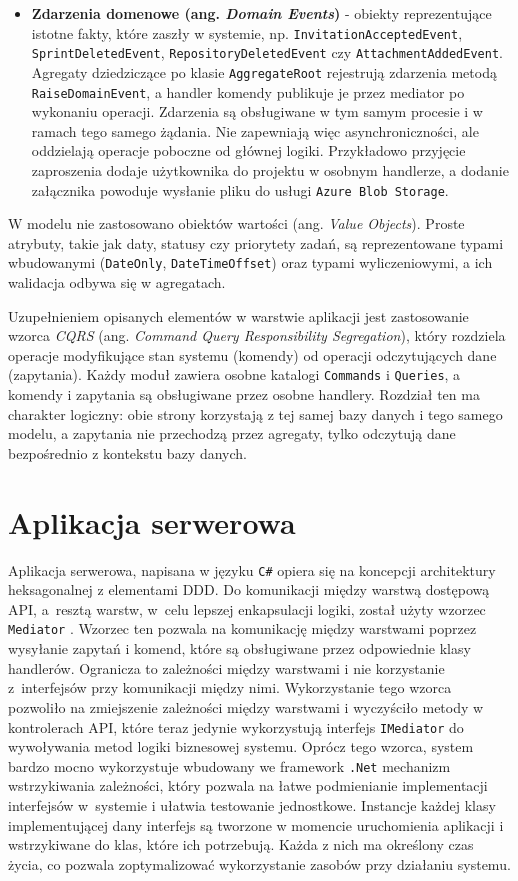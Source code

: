 \begin{itemize}
    \item \textbf{Zdarzenia domenowe (ang. \textit{Domain Events})} - obiekty reprezentujące istotne fakty, które zaszły w systemie, np. \texttt{InvitationAcceptedEvent}, \texttt{SprintDeletedEvent}, \texttt{RepositoryDeletedEvent} czy \texttt{AttachmentAddedEvent}. Agregaty dziedziczące po klasie \texttt{AggregateRoot} rejestrują zdarzenia metodą \texttt{RaiseDomainEvent}, a handler komendy publikuje je przez mediator po wykonaniu operacji. Zdarzenia są obsługiwane w tym samym procesie i w ramach tego samego żądania. Nie zapewniają więc asynchroniczności, ale oddzielają operacje poboczne od głównej logiki. Przykładowo przyjęcie zaproszenia dodaje użytkownika do projektu w osobnym handlerze, a dodanie załącznika powoduje wysłanie pliku do usługi \texttt{Azure Blob Storage}.
\end{itemize}

W modelu nie zastosowano obiektów wartości (ang. \textit{Value Objects}). Proste atrybuty, takie jak daty, statusy czy priorytety zadań, są reprezentowane typami wbudowanymi (\texttt{DateOnly}, \texttt{DateTimeOffset}) oraz typami wyliczeniowymi, a ich walidacja odbywa się w agregatach.

Uzupełnieniem opisanych elementów w warstwie aplikacji jest zastosowanie wzorca \textit{CQRS} (ang. \textit{Command Query Responsibility Segregation}), który rozdziela operacje modyfikujące stan systemu (komendy) od operacji odczytujących dane (zapytania). Każdy moduł zawiera osobne katalogi \texttt{Commands} i \texttt{Queries}, a komendy i zapytania są obsługiwane przez osobne handlery. Rozdział ten ma charakter logiczny: obie strony korzystają z tej samej bazy danych i tego samego modelu, a zapytania nie przechodzą przez agregaty, tylko odczytują dane bezpośrednio z kontekstu bazy danych.

\section{Aplikacja serwerowa}
Aplikacja serwerowa, napisana w języku \texttt{C\#} opiera się na koncepcji architektury heksagonalnej z elementami DDD. Do komunikacji między warstwą dostępową API, a~resztą warstw,
w~celu lepszej enkapsulacji logiki, został użyty wzorzec \texttt{Mediator} \cite{mediator_pattern}. Wzorzec ten pozwala na komunikację między warstwami poprzez wysyłanie zapytań i komend, które są obsługiwane przez odpowiednie klasy handlerów.
Ogranicza to zależności między warstwami i nie korzystanie z~interfejsów przy komunikacji między nimi. Wykorzystanie tego wzorca pozwoliło na 
zmiejszenie zależności między warstwami i wyczyściło metody w kontrolerach API, które teraz jedynie wykorzystują interfejs \texttt{IMediator} do wywoływania metod logiki biznesowej systemu.
Oprócz tego wzorca, system bardzo mocno wykorzystuje wbudowany we framework \texttt{.Net} mechanizm wstrzykiwania zależności, który pozwala na łatwe podmienianie implementacji interfejsów w~systemie i ułatwia testowanie jednostkowe.
Instancje każdej klasy implementującej dany interfejs są tworzone w momencie uruchomienia aplikacji i wstrzykiwane do klas, które ich potrzebują. Każda z nich ma określony czas życia, co pozwala zoptymalizować wykorzystanie zasobów przy działaniu systemu.

